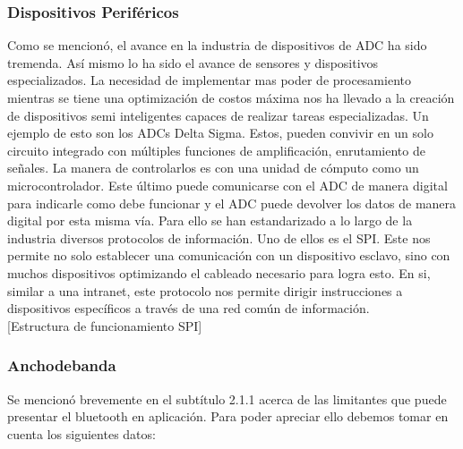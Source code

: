 \subsubsection{Dispositivos Periféricos}
\label{sec:orga31ff13}
Como se mencionó, el avance en la industria de dispositivos de ADC ha sido tremenda. Así mismo lo ha sido el avance de sensores y dispositivos especializados. La necesidad de implementar mas poder de procesamiento mientras se tiene una optimización de costos máxima nos ha llevado a la creación de dispositivos semi inteligentes capaces de realizar tareas especializadas. Un ejemplo de esto son los ADCs Delta Sigma. Estos, pueden convivir en un solo circuito integrado con múltiples funciones de amplificación, enrutamiento de señales. La manera de controlarlos es con una unidad de cómputo como un microcontrolador. Este último puede comunicarse con el ADC de manera digital para indicarle como debe funcionar y el ADC puede devolver los datos de manera digital por esta misma vía. Para ello se han estandarizado a lo largo de la industria diversos protocolos de información. Uno de ellos es el SPI. Este nos permite no solo establecer una comunicación con un dispositivo esclavo, sino con muchos dispositivos optimizando el cableado necesario para logra esto. En si, similar a una intranet, este protocolo nos permite dirigir instrucciones a dispositivos específicos a través de una red común de información.\\

[Estructura de funcionamiento SPI]\\

\subsubsection{Anchodebanda}
\label{sec:org3546b70}
Se mencionó brevemente en el subtítulo 2.1.1 acerca de las limitantes que puede presentar el bluetooth en aplicación. Para poder apreciar ello debemos tomar en cuenta los siguientes datos:\\

